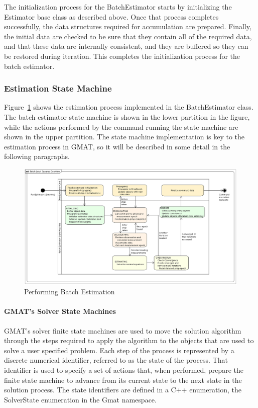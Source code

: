 The initialization process for the BatchEstimator starts by initializing the Estimator base class as described above.  Once that process completes successfully, the data structures required for accumulation are prepared.  Finally, the initial data are checked to be sure that they contain all of the required data, and that these data are internally consistent, and they are buffered so they can be restored during iteration.  This completes the initialization process for the batch estimator.

\subsubsection{Estimation State Machine}

Figure~\ref{fig:BatchEstimatorOverview} shows the estimation process implemented in the BatchEstimator class.  The batch estimator state machine is shown in the lower partition in the figure, while the actions performed by the command running the state machine are shown in the upper partition.  The state machine implementation is key to the estimation process in GMAT, so it will be described in some detail in the following paragraphs.

\begin{figure}[htbp]
\begin{center}
\includegraphics[scale=0.4]{Images/BatchLeastSquaresOverview.eps}
\caption{\label{fig:BatchEstimatorOverview}Performing Batch Estimation}
\end{center}
\end{figure}

\paragraph{GMAT's Solver State Machines}

GMAT's solver finite state machines are used to move the solution algorithm through the steps required to apply the algorithm to the objects that are used to solve a user specified problem. Each step of the process is represented by a discrete numerical identifier, referred to as the state of the process.  That identifier is used to specify a set of actions that, when performed, prepare the finite state machine to advance from its current state to the next state in the solution process.  The state identifiers are defined in a C++ enumeration, the SolverState enumeration in the Gmat namespace.


